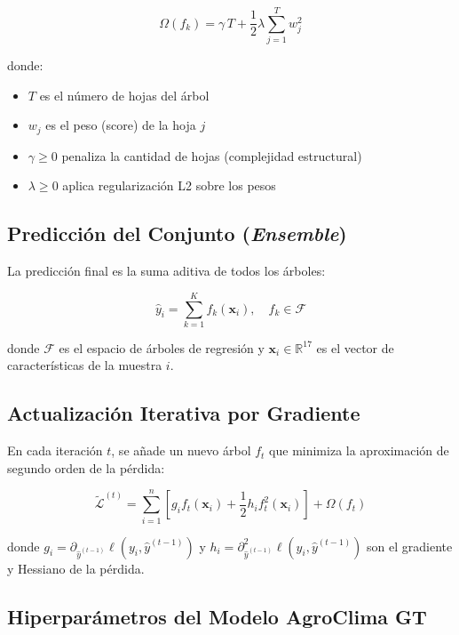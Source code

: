 \documentclass[12pt, a4paper]{article}
\begin{document}
\begin{equation}
  \Omega(f_k) = \gamma\, T + \frac{1}{2}\lambda \sum_{j=1}^{T} w_j^2
  \label{eq:regularizacion}
\end{equation}

donde:
\begin{itemize}[leftmargin=2cm]
  \item $T$ es el número de hojas del árbol
  \item $w_j$ es el peso (score) de la hoja $j$
  \item $\gamma \geq 0$ penaliza la cantidad de hojas (complejidad estructural)
  \item $\lambda \geq 0$ aplica regularización L2 sobre los pesos
\end{itemize}

\subsection{Predicción del Conjunto (\textit{Ensemble})}

La predicción final es la suma aditiva de todos los árboles:

\begin{equation}
  \hat{y}_i = \sum_{k=1}^{K} f_k(\mathbf{x}_i), \quad f_k \in \mathcal{F}
  \label{eq:ensemble}
\end{equation}

donde $\mathcal{F}$ es el espacio de árboles de regresión y $\mathbf{x}_i \in \mathbb{R}^{17}$ es el vector de características de la muestra $i$.

\subsection{Actualización Iterativa por Gradiente}

En cada iteración $t$, se añade un nuevo árbol $f_t$ que minimiza la aproximación de segundo orden de la pérdida:

\begin{equation}
  \tilde{\mathcal{L}}^{(t)} = \sum_{i=1}^{n}\left[ g_i f_t(\mathbf{x}_i) + \frac{1}{2} h_i f_t^2(\mathbf{x}_i) \right] + \Omega(f_t)
  \label{eq:iteracion}
\end{equation}

donde $g_i = \partial_{\hat{y}^{(t-1)}} \ell(y_i, \hat{y}^{(t-1)})$ y $h_i = \partial^2_{\hat{y}^{(t-1)}} \ell(y_i, \hat{y}^{(t-1)})$ son el gradiente y Hessiano de la pérdida.

\subsection{Hiperparámetros del Modelo AgroClima GT}
\end{document}
